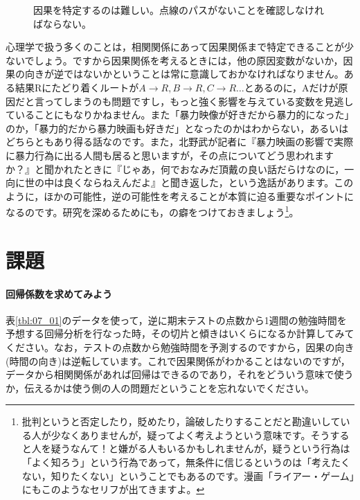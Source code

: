\documentclass{ltjbook}
\begin{document}
\begin{figure}[ht]
	\centering
	\caption{因果を特定するのは難しい。点線のパスがないことを確認しなければならない。}
	\label{fig:07_05}
	
\end{figure}


心理学で扱う多くのことは，相関関係にあって因果関係まで特定できることが少ないでしょう。ですから因果関係を考えるときには，他の原因変数がないか，因果の向きが逆ではないかということは常に意識しておかなければなりません。ある結果Rにたどり着くルートが$A \to R, B\to R, C\to R \ldots$とあるのに，Aだけが原因だと言ってしまうのも問題ですし，もっと強く影響を与えている変数を見逃していることにもなりかねません。また「暴力映像が好きだから暴力的になった」のか，「暴力的だから暴力映画も好きだ」となったのかはわからない，あるいはどちらともあり得る話なのです。また，北野武が記者に『暴力映画の影響で実際に暴力行為に出る人間も居ると思いますが，その点についてどう思われますか？』と聞かれたときに『じゃあ，何でおなみだ頂戴の良い話だらけなのに，一向に世の中は良くならねえんだよ』と聞き返した，という逸話があります。このように，ほかの可能性，逆の可能性を考えることが本質に迫る重要なポイントになるのです。研究を深めるためにも，の癖をつけておきましょう\footnote{批判というと否定したり，貶めたり，論破したりすることだと勘違いしている人が少なくありませんが，疑ってよく考えようという意味です。そうすると人を疑うなんて！と嫌がる人もいるかもしれませんが，疑うという行為は「よく知ろう」という行為であって，無条件に信じるというのは「考えたくない，知りたくない」ということでもあるのです。漫画「ライアー・ゲーム」にもこのようなセリフが出てきますよ。}。

\section{課題}
\paragraph{回帰係数を求めてみよう}表\ref{tbl:07_01}のデータを使って，逆に期末テストの点数から1週間の勉強時間を予想する回帰分析を行なった時，その切片と傾きはいくらになるか計算してみてください。なお，テストの点数から勉強時間を予測するのですから，因果の向き(時間の向き)は逆転しています。これで因果関係がわかることはないのですが，データから相関関係があれば回帰はできるのであり，それをどういう意味で使うか，伝えるかは使う側の人の問題だということを忘れないでください。
\end{document}
